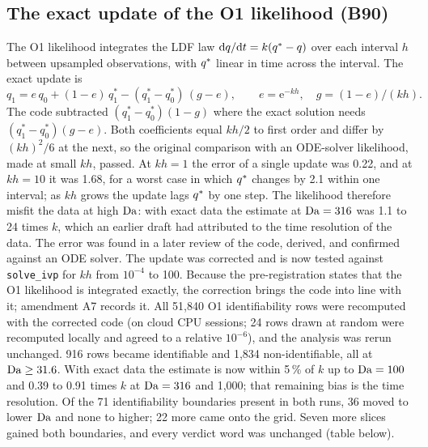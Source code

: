 \subsection*{The exact update of the O1 likelihood (B90)}
The O1 likelihood integrates the LDF law $\mathrm{d}q/\mathrm{d}t = k(q^{*} - q)$ over each interval
$h$ between upsampled observations, with $q^{*}$ linear in time across the interval. The exact
update is
\[
q_{1} = e\,q_{0} + (1 - e)\,q^{*}_{1} - (q^{*}_{1} - q^{*}_{0})\,(g - e), \qquad
e = \mathrm{e}^{-kh},\quad g = (1 - e)/(kh).
\]
The code subtracted $(q^{*}_{1} - q^{*}_{0})(1 - g)$ where the exact solution needs
$(q^{*}_{1} - q^{*}_{0})(g - e)$. Both coefficients equal $kh/2$ to first order and differ by
$(kh)^{2}/6$ at the next, so the original
comparison with an ODE-solver likelihood, made at small $kh$, passed. At $kh = 1$ the error of a
single update was 0.22, and at $kh = 10$ it was 1.68, for a worst case in which $q^{*}$ changes by
2.1 within one interval; as $kh$ grows the
update lags $q^{*}$ by one step. The likelihood therefore misfit the data at high $\mathrm{Da}$: with exact
data the estimate at $\mathrm{Da} = 316$ was 1.1 to 24 times $k$, which an earlier draft had attributed
to the time resolution of the data. The error was found in a later review of the code, derived,
and confirmed against an ODE solver. The update was corrected and is now tested against
\texttt{solve\_ivp} for $kh$ from $10^{-4}$ to 100. Because the pre-registration states that the
O1 likelihood is integrated exactly, the correction brings the code into line with it;
amendment A7 records it. All 51,840 O1 identifiability rows were recomputed with the corrected
code (on cloud CPU sessions; 24 rows drawn at random were recomputed locally and agreed to a
relative $10^{-6}$), and the analysis was rerun unchanged. 916 rows became identifiable and 1,834
non-identifiable, all at $\mathrm{Da} \ge 31.6$. With exact data the estimate is now within 5\,\% of $k$
up to $\mathrm{Da} = 100$ and 0.39 to 0.91 times $k$ at $\mathrm{Da} = 316$ and 1,000; that remaining bias is the
time resolution. Of the 71 identifiability boundaries present in both runs, 36 moved to lower
$\mathrm{Da}$ and none to higher; 22 more came onto the grid. Seven more slices gained both boundaries,
and every verdict word was unchanged (table below).

